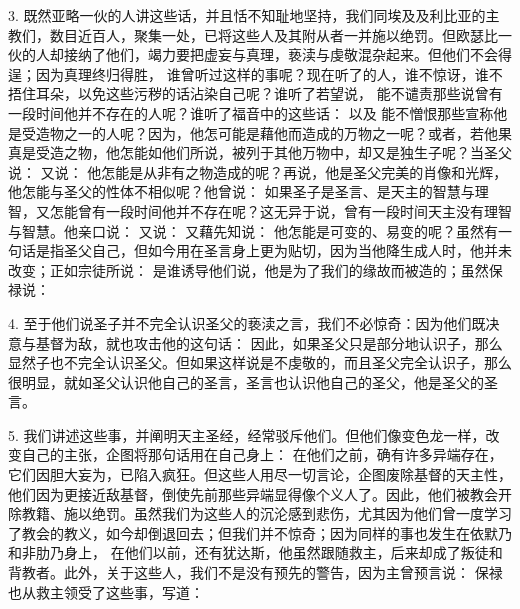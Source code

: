 3. 既然亚略一伙的人讲这些话，并且恬不知耻地坚持，我们同埃及及利比亚的主教们，数目近百人，聚集一处，已将这些人及其附从者一并施以绝罚。但欧瑟比一伙的人却接纳了他们，竭力要把虚妄与真理，亵渎与虔敬混杂起来。但他们不会得逞；因为真理终归得胜， 谁曾听过这样的事呢？现在听了的人，谁不惊讶，谁不捂住耳朵，以免这些污秽的话沾染自己呢？谁听了若望说， 能不谴责那些说曾有一段时间他并不存在的人呢？谁听了福音中的这些话： 以及  能不憎恨那些宣称他是受造物之一的人呢？因为，他怎可能是藉他而造成的万物之一呢？或者，若他果真是受造之物，他怎能如他们所说，被列于其他万物中，却又是独生子呢？当圣父说： 又说： 他怎能是从非有之物造成的呢？再说，他是圣父完美的肖像和光辉，他怎能与圣父的性体不相似呢？他曾说： 如果圣子是圣言、是天主的智慧与理智，又怎能曾有一段时间他并不存在呢？这无异于说，曾有一段时间天主没有理智与智慧。他亲口说： 又说： 又藉先知说： 他怎能是可变的、易变的呢？虽然有一句话是指圣父自己，但如今用在圣言身上更为贴切，因为当他降生成人时，他并未改变；正如宗徒所说： 是谁诱导他们说，他是为了我们的缘故而被造的；虽然保禄说：\par

4. 至于他们说圣子并不完全认识圣父的亵渎之言，我们不必惊奇：因为他们既决意与基督为敌，就也攻击他的这句话： 因此，如果圣父只是部分地认识子，那么显然子也不完全认识圣父。但如果这样说是不虔敬的，而且圣父完全认识子，那么很明显，就如圣父认识他自己的圣言，圣言也认识他自己的圣父，他是圣父的圣言。\par

5. 我们讲述这些事，并阐明天主圣经，经常驳斥他们。但他们像变色龙一样，改变自己的主张，企图将那句话用在自己身上： 在他们之前，确有许多异端存在，它们因胆大妄为，已陷入疯狂。但这些人用尽一切言论，企图废除基督的天主性，他们因为更接近敌基督，倒使先前那些异端显得像个义人了。因此，他们被教会开除教籍、施以绝罚。虽然我们为这些人的沉沦感到悲伤，尤其因为他们曾一度学习了教会的教义，如今却倒退回去；但我们并不惊奇；因为同样的事也发生在依默乃和非肋乃身上， 在他们以前，还有犹达斯，他虽然跟随救主，后来却成了叛徒和背教者。此外，关于这些人，我们不是没有预先的警告，因为主曾预言说： 保禄也从救主领受了这些事，写道：\par


